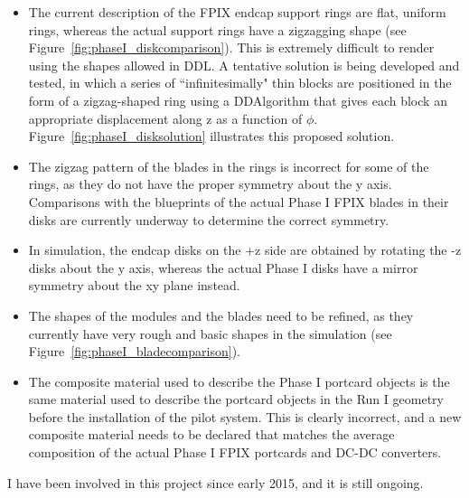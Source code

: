 \begin{itemize}
\item The current description of the FPIX endcap support rings are flat, uniform rings, whereas the actual support rings have a zigzagging shape (see Figure~\ref{fig:phaseI_diskcomparison}). This is extremely difficult to render using the shapes allowed in DDL. A tentative solution is being developed and tested, in which a series of ``infinitesimally" thin blocks are positioned in the form of a zigzag-shaped ring using a DDAlgorithm that gives each block an appropriate displacement along z as a function of $\phi$. Figure~\ref{fig:phaseI_disksolution} illustrates this proposed solution.
\item The zigzag pattern of the blades in the rings is incorrect for some of the rings, as they do not have the proper symmetry about the y axis. Comparisons with the blueprints of the actual Phase I FPIX blades in their disks are currently underway to determine the correct symmetry.
\item In simulation, the endcap disks on the +z side are obtained by rotating the -z disks about the y axis, whereas the actual Phase I disks have a mirror symmetry about the xy plane instead.
\item The shapes of the modules and the blades need to be refined, as they currently have very rough and basic shapes in the simulation (see Figure~\ref{fig:phaseI_bladecomparison}).
\item The composite material used to describe the Phase I portcard objects is the same material used to describe the portcard objects in the Run I geometry before the installation of the pilot system. This is clearly incorrect, and a new composite material needs to be declared that matches the average composition of the actual Phase I FPIX portcards and DC-DC converters.
\end{itemize}

I have been involved in this project since early 2015, and it is still ongoing.

